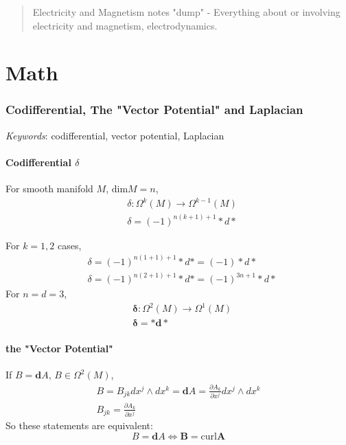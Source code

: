 \documentclass[10pt]{amsart}
\begin{document}
\begin{multicols*}{2}


\begin{abstract}
Electricity and Magnetism notes "dump" - Everything about or involving electricity and magnetism, electrodynamics.

\end{abstract}

\part{Math}

\section{Codifferential, The "Vector Potential" and Laplacian}  
\emph{Keywords}: codifferential, vector potential, Laplacian

\subsection{Codifferential $\delta$}

For smooth manifold $M$, $\text{dim}M = n$, 
\begin{equation}
\boxed{
\begin{aligned}
	& \delta : \Omega^k(M) \to \Omega^{k-1}(M) \\ 	
	& \delta = (-1)^{n(k+1)+1} * d*
\end{aligned}
}
\end{equation}

For $k=1,2$ cases, 
\[
\begin{aligned}
	& \delta = (-1)^{n(1+1)+1} * d* = (-1) *d* \\ 
	& \delta = (-1)^{n(2+1) + 1} * d * = (-1)^{3n+1} *d*
\end{aligned}
\]
For $n=d=3$, 
\[
\begin{aligned}
	& \mathbf{\delta} : \Omega^2(M) \to \Omega^1(M) \\ 
	& \mathbf{\delta} = \mathbf{* d * }
\end{aligned}
\]

\subsection{the "Vector Potential"}

If $B=\mathbf{d} A$, $B\in \Omega^2(M)$, 
\[
\begin{gathered}
B= B_{jk} dx^j \wedge dx^k = \mathbf{d}A = \frac{ \partial A_k}{ \partial x^j} dx^j \wedge dx^k  \\
 B_{jk} = \frac{ \partial A_k}{ \partial x^j} 
\end{gathered}
\]
So these statements are equivalent: 
\begin{equation}
\boxed{ 
B =\mathbf{d} A \Longleftrightarrow \mathbf{B} = \text{curl} \mathbf{A}
}
\end{equation}


\end{multicols*}
\end{document}
